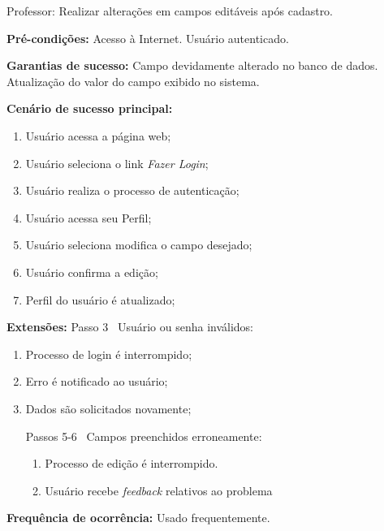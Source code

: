 \documentclass[12pt,oneside,a4paper,article]{abntex2}
\begin{document}
		Professor: Realizar alterações em campos editáveis após cadastro.
		
		\textbf{Pré-condições:} Acesso à Internet. Usuário autenticado.
		
		\textbf{Garantias de sucesso:} Campo devidamente alterado no banco de dados. Atualização do valor do campo exibido no sistema. 
		
		\textbf{Cenário de sucesso principal:}
		
		\begin{enumerate}
			\item Usuário acessa a página web;
			
			\item Usuário seleciona o link \textit{Fazer Login};
			
			\item Usuário realiza o processo de autenticação;
			
			\item Usuário acessa seu Perfil;
			
			\item Usuário seleciona modifica o campo desejado;
			
			\item Usuário confirma a edição;
			
			\item Perfil do usuário é atualizado;
			
		\end{enumerate}
		
		\textbf{Extensões:} Passo 3 \textrightarrow \ Usuário ou senha inválidos:
		
		\begin{enumerate}[label=\alph*.]	
			\item Processo de login é interrompido;
			\item Erro é notificado ao usuário;
			\item Dados são solicitados novamente;	
			
		Passos 5-6 \textrightarrow \ Campos preenchidos erroneamente:
		
		\begin{enumerate}[label=\alph*.]	
			\item Processo de edição é interrompido.
			\item Usuário recebe \textit{feedback} relativos ao problema	
		\end{enumerate}
		
		\end{enumerate}
		
		\textbf{Frequência de ocorrência:} Usado frequentemente.
		
\end{document}
